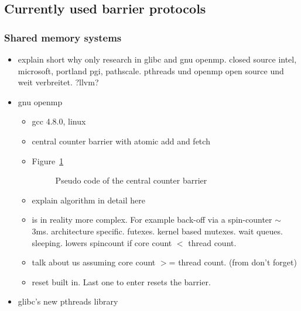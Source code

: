 \documentclass[a4paper, 10pt]{article}
\begin{document}
\begin{enumerate}
\subsection{Currently used barrier protocols}
\label{ssec:existing-currently-used}

\subsubsection{Shared memory systems}
\label{sssec:existing-currently-used-shared}
\begin{itemize}
	\item explain short why only research in glibc and gnu openmp\cite{openmp}. closed source intel, microsoft, portland pgi, pathscale. pthreads und openmp open source und weit verbreitet. ?llvm?
	\item gnu openmp\cite{gomp}
		\begin{itemize}
			\item gcc 4.8.0, linux
			\item central counter barrier with atomic add and fetch
			\item Figure~\ref{fig:central-counter-no-reset}
				\begin{figure}[htbp]
					\centering
					
					\caption{Pseudo code of the central counter barrier}
					\label{fig:central-counter-no-reset}
				\end{figure}
			\item explain algorithm in detail here
			\item is in reality more complex. For example back-off via a spin-counter $\sim$ 3ms. architecture specific. futexes\cite{franke2002}. kernel based mutexes. wait queues. sleeping. lowers spincount if core count $<$ thread count.
			\item talk about us assuming core count $>$= thread count. (from don't forget)
			\item reset built in. Last one to enter resets the barrier.
		\end{itemize}
	\item glibc's\cite{glibc} new pthreads library

\end{itemize}
\end{enumerate}
\end{document}
